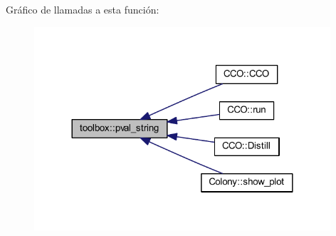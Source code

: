 Gráfico de llamadas a esta función\+:
\nopagebreak
\begin{figure}[H]
\begin{center}
\leavevmode
\includegraphics[width=312pt]{classtoolbox_ad3c9eb0127e47a8ce04922646ade51fc_icgraph}
\end{center}
\end{figure}


